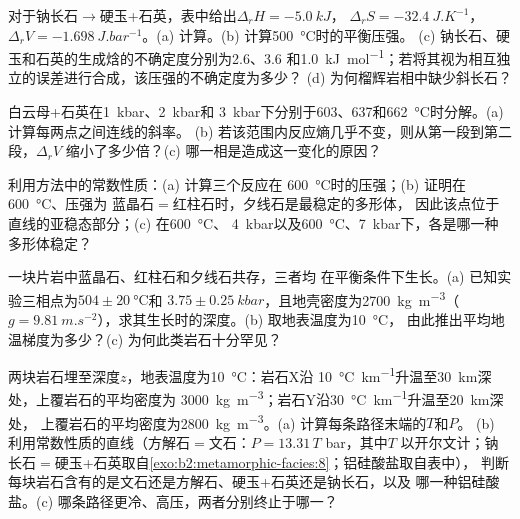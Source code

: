 \begin{exercise}[$\star\star$]\label{exo:b2:metamorphic-facies:8}
对于钠长石$\to$硬玉+石英，表中给出$\Delta_r H = \qty{-5.0}{kJ}$，
$\Delta_r S = \qty{-32.4}{J.K^{-1}}$，$\Delta_r V = \qty{-1.698}{J.bar^{-1}}$。(a)
计算。(b) 计算\qty{500}{\celsius}时的平衡压强。
(c) 钠长石、硬玉和石英的生成焓的不确定度分别为2.6、3.6
和\qty{1.0}{kJ.mol^{-1}}；若将其视为相互独立的误差进行合成，该压强的不确定度为多少？
(d) 为何榴辉岩相中缺少斜长石？
\end{exercise}

\begin{exercise}[$\star\star$]\label{exo:b2:metamorphic-facies:9}
白云母+石英在\qty{1}{kbar}、\qty{2}{kbar}和
\qty{3}{kbar}下分别于603、637和\qty{662}{\celsius}时分解。(a) 计算每两点之间连线的斜率。
(b) 若该范围内反应熵几乎不变，则从第一段到第二段，$\Delta_r V$
缩小了多少倍？(c) 哪一相是造成这一变化的原因？
\end{exercise}

\begin{exercise}[$\star\star\star$]\label{exo:b2:metamorphic-facies:10}
利用方法中的常数性质：(a) 计算三个反应在
\qty{600}{\celsius}时的压强；(b) 证明在\qty{600}{\celsius}、压强为
蓝晶石$=$红柱石时，夕线石是最稳定的多形体，
因此该点位于直线的亚稳态部分；(c) 在\qty{600}{\celsius}、
\qty{4}{kbar}以及\qty{600}{\celsius}、\qty{7}{kbar}下，各是哪一种多形体稳定？
\end{exercise}

\begin{exercise}[$\star\star\star$]\label{exo:b2:metamorphic-facies:11}
一块片岩中蓝晶石、红柱石和夕线石共存，三者均
在平衡条件下生长。(a) 已知实验三相点为$504 \pm \qty{20}{\celsius}$和
$3.75 \pm \qty{0.25}{kbar}$，且地壳密度为\qty{2700}{kg.m^{-3}}（$g =
\qty{9.81}{m.s^{-2}}$），求其生长时的深度。(b) 取地表温度为\qty{10}{\celsius}，
由此推出平均地温梯度为多少？(c) 为何此类岩石十分罕见？
\end{exercise}

\begin{exercise}[$\star\star\star$]\label{exo:b2:metamorphic-facies:12}
两块岩石埋至深度$z$，地表温度为\qty{10}{\celsius}：岩石X沿
\qty{10}{\celsius.km^{-1}}升温至\qty{30}{km}深处，上覆岩石的平均密度为
\qty{3000}{kg.m^{-3}}；岩石Y沿\qty{30}{\celsius.km^{-1}}升温至\qty{20}{km}深处，
上覆岩石的平均密度为\qty{2800}{kg.m^{-3}}。(a) 计算每条路径末端的$T$和$P$。
(b) 利用常数性质的直线（方解石$=$文石：$P = 13.31\,T$ bar，其中$T$
以开尔文计；钠长石$=$硬玉+石英取自\cref{exo:b2:metamorphic-facies:8}；铝硅酸盐取自表中），
判断每块岩石含有的是文石还是方解石、硬玉+石英还是钠长石，以及
哪一种铝硅酸盐。(c) 哪条路径更冷、高压，两者分别终止于哪一？
\end{exercise}

